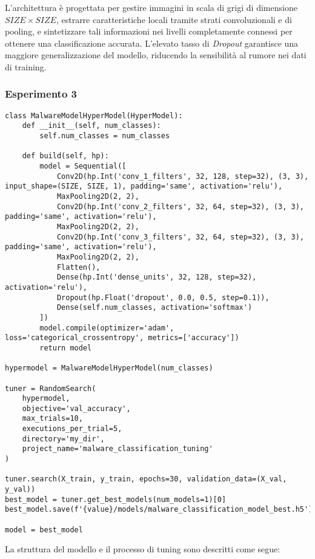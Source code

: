 L'architettura è progettata per gestire immagini in scala di grigi di dimensione $SIZE \times SIZE$, estrarre caratteristiche locali tramite strati convoluzionali e di pooling, e sintetizzare tali informazioni nei livelli completamente connessi per ottenere una classificazione accurata. L'elevato tasso di \textit{Dropout} garantisce una maggiore generalizzazione del modello, riducendo la sensibilità al rumore nei dati di training.


\subsubsection{Esperimento 3}
\begin{lstlisting}[caption={Terzo modello di CNN creato},captionpos=b]
class MalwareModelHyperModel(HyperModel):
    def __init__(self, num_classes):
        self.num_classes = num_classes

    def build(self, hp):
        model = Sequential([
            Conv2D(hp.Int('conv_1_filters', 32, 128, step=32), (3, 3), input_shape=(SIZE, SIZE, 1), padding='same', activation='relu'),
            MaxPooling2D(2, 2),
            Conv2D(hp.Int('conv_2_filters', 32, 64, step=32), (3, 3), padding='same', activation='relu'),
            MaxPooling2D(2, 2),
            Conv2D(hp.Int('conv_3_filters', 32, 64, step=32), (3, 3), padding='same', activation='relu'),
            MaxPooling2D(2, 2),
            Flatten(),
            Dense(hp.Int('dense_units', 32, 128, step=32), activation='relu'),
            Dropout(hp.Float('dropout', 0.0, 0.5, step=0.1)),
            Dense(self.num_classes, activation='softmax')
        ])
        model.compile(optimizer='adam', loss='categorical_crossentropy', metrics=['accuracy'])
        return model

hypermodel = MalwareModelHyperModel(num_classes)

tuner = RandomSearch(
    hypermodel,
    objective='val_accuracy',
    max_trials=10,
    executions_per_trial=5,
    directory='my_dir',
    project_name='malware_classification_tuning'
)

tuner.search(X_train, y_train, epochs=30, validation_data=(X_val, y_val))
best_model = tuner.get_best_models(num_models=1)[0]
best_model.save(f'{value}/models/malware_classification_model_best.h5')

model = best_model
\end{lstlisting}
La struttura del modello e il processo di tuning sono descritti come segue:
